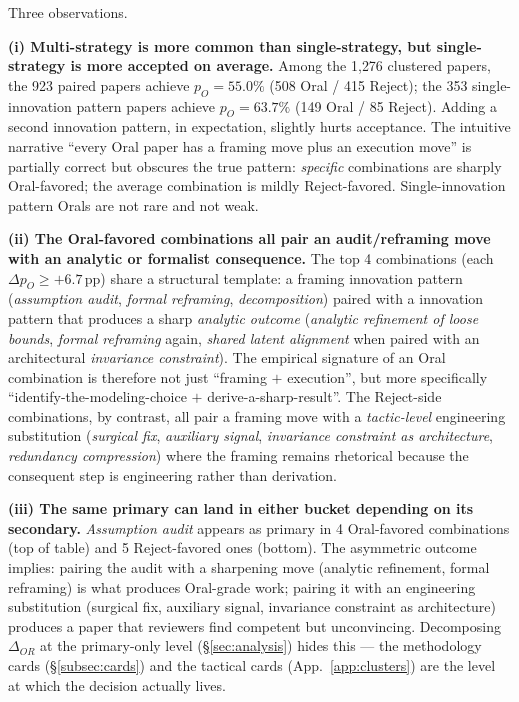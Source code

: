 \documentclass[10pt,a4paper]{article}
\begin{document}
Three observations.

\textbf{(i) Multi-strategy is more common than single-strategy, but single-strategy is more accepted on average.} Among the 1{,}276 clustered papers, the 923 paired papers achieve $p_O = 55.0\%$ (508 Oral / 415 Reject); the 353 single-innovation pattern papers achieve $p_O = 63.7\%$ (149 Oral / 85 Reject). Adding a second innovation pattern, in expectation, slightly hurts acceptance. The intuitive narrative ``every Oral paper has a framing move plus an execution move'' is partially correct but obscures the true pattern: \emph{specific} combinations are sharply Oral-favored; the average combination is mildly Reject-favored. Single-innovation pattern Orals are not rare and not weak.

\textbf{(ii) The Oral-favored combinations all pair an audit/reframing move with an analytic or formalist consequence.} The top 4 combinations (each $\Delta p_O \geq +6.7$\,pp) share a structural template: a framing innovation pattern (\emph{assumption audit}, \emph{formal reframing}, \emph{decomposition}) paired with a innovation pattern that produces a sharp \emph{analytic outcome} (\emph{analytic refinement of loose bounds}, \emph{formal reframing} again, \emph{shared latent alignment} when paired with an architectural \emph{invariance constraint}). The empirical signature of an Oral combination is therefore not just ``framing $+$ execution'', but more specifically ``identify-the-modeling-choice $+$ derive-a-sharp-result''. The Reject-side combinations, by contrast, all pair a framing move with a \emph{tactic-level} engineering substitution (\emph{surgical fix}, \emph{auxiliary signal}, \emph{invariance constraint as architecture}, \emph{redundancy compression}) where the framing remains rhetorical because the consequent step is engineering rather than derivation.

\textbf{(iii) The same primary can land in either bucket depending on its secondary.} \emph{Assumption audit} appears as primary in 4 Oral-favored combinations (top of table) and 5 Reject-favored ones (bottom). The asymmetric outcome implies: pairing the audit with a sharpening move (analytic refinement, formal reframing) is what produces Oral-grade work; pairing it with an engineering substitution (surgical fix, auxiliary signal, invariance constraint as architecture) produces a paper that reviewers find competent but unconvincing. Decomposing $\Delta_{OR}$ at the primary-only level (\S\ref{sec:analysis}) hides this --- the methodology cards (\S\ref{subsec:cards}) and the tactical cards (App.~\ref{app:clusters}) are the level at which the decision actually lives.
\end{document}
